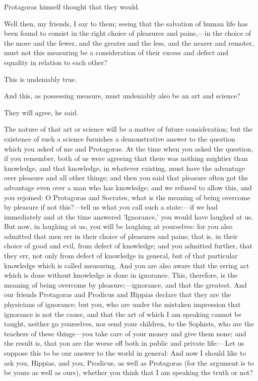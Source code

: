 \documentclass[11pt,letter]{article}
\begin{document}
\par  Protagoras himself thought that they would.

\par  Well then, my friends, I say to them; seeing that the salvation of human life has been found to consist in the right choice of pleasures and pains,—in the choice of the more and the fewer, and the greater and the less, and the nearer and remoter, must not this measuring be a consideration of their excess and defect and equality in relation to each other?

\par  This is undeniably true.

\par  And this, as possessing measure, must undeniably also be an art and science?

\par  They will agree, he said.

\par  The nature of that art or science will be a matter of future consideration; but the existence of such a science furnishes a demonstrative answer to the question which you asked of me and Protagoras. At the time when you asked the question, if you remember, both of us were agreeing that there was nothing mightier than knowledge, and that knowledge, in whatever existing, must have the advantage over pleasure and all other things; and then you said that pleasure often got the advantage even over a man who has knowledge; and we refused to allow this, and you rejoined: O Protagoras and Socrates, what is the meaning of being overcome by pleasure if not this?—tell us what you call such a state:—if we had immediately and at the time answered 'Ignorance,' you would have laughed at us. But now, in laughing at us, you will be laughing at yourselves: for you also admitted that men err in their choice of pleasures and pains; that is, in their choice of good and evil, from defect of knowledge; and you admitted further, that they err, not only from defect of knowledge in general, but of that particular knowledge which is called measuring. And you are also aware that the erring act which is done without knowledge is done in ignorance. This, therefore, is the meaning of being overcome by pleasure;—ignorance, and that the greatest. And our friends Protagoras and Prodicus and Hippias declare that they are the physicians of ignorance; but you, who are under the mistaken impression that ignorance is not the cause, and that the art of which I am speaking cannot be taught, neither go yourselves, nor send your children, to the Sophists, who are the teachers of these things—you take care of your money and give them none; and the result is, that you are the worse off both in public and private life:—Let us suppose this to be our answer to the world in general: And now I should like to ask you, Hippias, and you, Prodicus, as well as Protagoras (for the argument is to be yours as well as ours), whether you think that I am speaking the truth or not?
\end{document}
